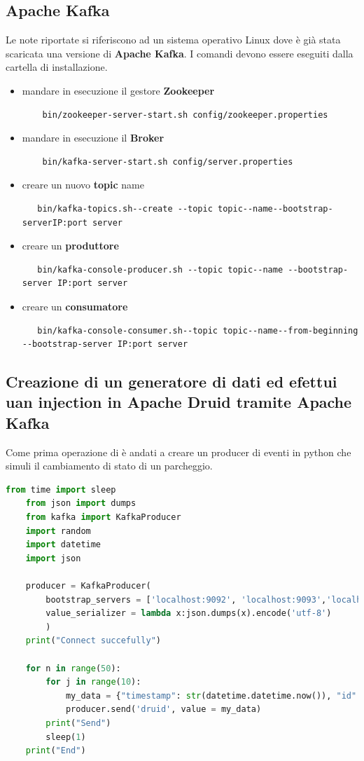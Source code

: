 \documentclass{article}
\begin{document}
\subsection{Apache Kafka}
Le note riportate si riferiscono ad un sistema operativo Linux dove è già stata scaricata una versione di \textbf{Apache Kafka}. I comandi devono essere eseguiti dalla cartella di installazione.
\begin{itemize}
    \item mandare in esecuzione il gestore \textbf{Zookeeper}
    \begin{lstlisting}
    bin/zookeeper-server-start.sh config/zookeeper.properties\end{lstlisting}
    \item mandare in esecuzione il \textbf{Broker}
    \begin{lstlisting}
    bin/kafka-server-start.sh config/server.properties\end{lstlisting}
    \item creare un nuovo \textbf{topic} name
   \noindent \begin{lstlisting}
   bin/kafka-topics.sh--create --topic topic--name--bootstrap-serverIP:port server \end{lstlisting}
   \item creare un \textbf{produttore} 
   \begin{lstlisting}
   bin/kafka-console-producer.sh --topic topic--name --bootstrap-server IP:port server \end{lstlisting}
   \item creare un \textbf{consumatore}
   \begin{lstlisting}
   bin/kafka-console-consumer.sh--topic topic--name--from-beginning --bootstrap-server IP:port server
   \end{lstlisting}

\end{itemize}
\pagebreak
\subsection{Creazione di un generatore di dati ed efettui uan injection in Apache Druid tramite Apache Kafka}
Come prima operazione di è andati a creare un producer di eventi in python che simuli il cambiamento di stato di un parcheggio.
\begin{lstlisting}[language=Python]
    from time import sleep  
    from json import dumps  
    from kafka import KafkaProducer  
    import random
    import datetime
    import json
    
    producer = KafkaProducer(  
        bootstrap_servers = ['localhost:9092', 'localhost:9093','localhost:9094'],  
        value_serializer = lambda x:json.dumps(x).encode('utf-8')  
        )  
    print("Connect succefully") 
    
    for n in range(50):  
        for j in range(10):
            my_data = {"timestamp": str(datetime.datetime.now()), "id" : str(random.randint(0,999)),"value": random.randint(0,1)} 
            producer.send('druid', value = my_data) 
        print("Send")
        sleep(1) 
    print("End")
\end{lstlisting}
\end{document}

